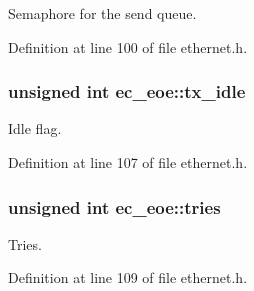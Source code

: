 Semaphore for the send queue. 



Definition at line 100 of file ethernet.\-h.

\subsubsection[{tx\-\_\-idle}]{\setlength{\rightskip}{0pt plus 5cm}unsigned int ec\-\_\-eoe\-::tx\-\_\-idle}\label{structec__eoe_a4f62dfcc5d7d43780af3e2520e66ab74}


Idle flag. 



Definition at line 107 of file ethernet.\-h.

\subsubsection[{tries}]{\setlength{\rightskip}{0pt plus 5cm}unsigned int ec\-\_\-eoe\-::tries}\label{structec__eoe_a94fc1a4085026439575dee3432a8613d}


Tries. 



Definition at line 109 of file ethernet.\-h.

